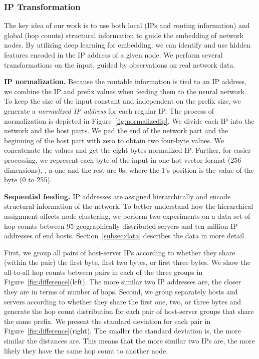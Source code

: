 \subsubsection{IP Transformation}
\label{dip:ipnorm}

The key idea of our work is to use both local (IPs and routing information) and global (hop counts) structural information to guide the embedding of network nodes. By utilizing deep learning for embedding, we can identify and use hidden features encoded in the IP address of a given node. We perform several transformations on the input, guided by observations on real network data.

\textbf{IP normalization.} Because the routable information is tied to an IP address, we combine the IP and prefix values when feeding them to the neural network. To keep the size of the input constant and independent on the prefix size, we generate a {\em normalized IP address} for each regular IP. The process of normalization is depicted in Figure~\ref{fig:normalizedip}. We divide each IP into the network and the host parts. We pad the end of the network part and the beginning of the host part with zero to obtain two four-byte values. We concatenate the values and get the eight bytes normalized IP. Further, for easier processing, we represent each byte of the input in one-hot vector format (256 dimensions), \eg{}, a one and the rest are 0s, where the 1's position is the value of the byte (0 to 255).

\textbf{Sequential feeding.}  IP addresses are assigned hierarchically and encode structural information of the network. To better understand how the hierarchical assignment affects node clustering, we perform two experiments on a data set of hop counts between 95 geographically distributed servers and ten million IP addresses of end hosts. Section~\ref{subsec:data} describes the data in more detail.

First, we group all pairs of host-server IPs according to whether they share (within the pair) the first byte, first two bytes, or first three bytes. We show the all-to-all hop counts between pairs in each of the three groups in Figure~\ref{fig:difference}(left). The more similar two IP addresses are, the closer they are in terms of number of hops. 
%
Second, we group separately hosts and servers according to whether they share the first one, two, or three bytes and generate the hop count distribution for each pair of host-server groups that share the same prefix. We present the standard deviation for each pair in 
Figure~\ref{fig:difference}(right). The smaller the standard deviation is, the more similar the distances are. This means that the more similar two IPs are, the more likely they have the same hop count to another node. 






